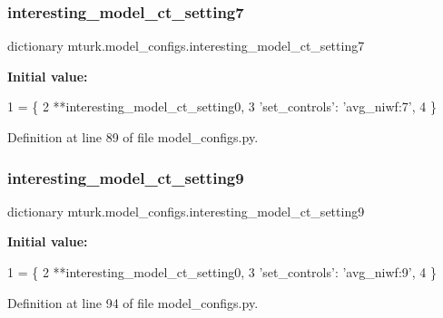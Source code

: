 \subsubsection{\texorpdfstring{interesting\+\_\+model\+\_\+ct\+\_\+setting7}{interesting\_model\_ct\_setting7}}
{\footnotesize\ttfamily dictionary mturk.\+model\+\_\+configs.\+interesting\+\_\+model\+\_\+ct\+\_\+setting7}

{\bfseries Initial value\+:}
\begin{DoxyCode}
1 =  \{
2     **interesting\_model\_ct\_setting0,
3     \textcolor{stringliteral}{'set\_controls'}: \textcolor{stringliteral}{'avg\_niwf:7'},
4 \}
\end{DoxyCode}


Definition at line 89 of file model\+\_\+configs.\+py.

\mbox{\label{namespacemturk_1_1model__configs_a3abec9c2c49fae2c96791d8d1a4338f4}} 
\subsubsection{\texorpdfstring{interesting\+\_\+model\+\_\+ct\+\_\+setting9}{interesting\_model\_ct\_setting9}}
{\footnotesize\ttfamily dictionary mturk.\+model\+\_\+configs.\+interesting\+\_\+model\+\_\+ct\+\_\+setting9}

{\bfseries Initial value\+:}
\begin{DoxyCode}
1 =  \{
2     **interesting\_model\_ct\_setting0,
3     \textcolor{stringliteral}{'set\_controls'}: \textcolor{stringliteral}{'avg\_niwf:9'},
4 \}
\end{DoxyCode}


Definition at line 94 of file model\+\_\+configs.\+py.

\mbox{\label{namespacemturk_1_1model__configs_a71392e8c79c0244635db30b384856bf9}} 
